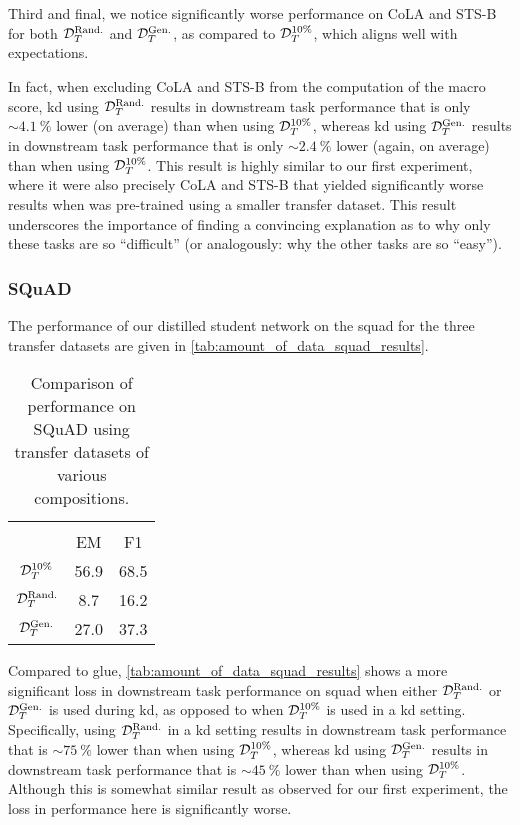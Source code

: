 Third and final, we notice significantly worse performance on CoLA and STS-B for both $\mathcal{D}_T^{\text{Rand.}}$ and $\mathcal{D}_T^{\text{Gen.}}$, as compared to $\mathcal{D}_T^{10\%}$, which aligns well with expectations.

In fact, when excluding CoLA and STS-B from the computation of the macro score, \gls{kd} using $\mathcal{D}_T^{\text{Rand.}}$ results in downstream task performance that is only $\sim \SI{4.1}{\percent}$ lower (on average) than when using $\mathcal{D}_T^{10\%}$, whereas \gls{kd} using $\mathcal{D}_T^{\text{Gen.}}$ results in downstream task performance that is only $\sim \SI{2.4}{\percent}$ lower  (again, on average) than when using $\mathcal{D}_T^{10\%}$. This result is highly similar to our first experiment, where it were also precisely CoLA and STS-B that yielded significantly worse results when \bertstudent was pre-trained using a smaller transfer dataset.  This result underscores the importance of finding a convincing explanation as to why only these tasks are so ``difficult'' (or analogously: why the other tasks are so ``easy'').

\subsubsection{SQuAD}
The performance of our distilled student network \bertstudent on the \gls{squad} for the three transfer datasets  are given in \cref{tab:amount_of_data_squad_results}.
\begin{table}[ht!]
    \footnotesize
    \centering
    \renewcommand{\arraystretch}{1.5}
    \begin{tabular}{c | c c }
        \toprule
        \multirow{2}{*}{\B{Transfer dataset}} & \multicolumn{2}{c}{\B{Score}} \\
        & EM & F1 \\
        \midrule
        $\mathcal{D}_T^{10\%}$ & 56.9 & 68.5 \\
        $\mathcal{D}_T^{\text{Rand.}}$ & 8.7 & 16.2 \\
        $\mathcal{D}_T^{\text{Gen.}}$ &  27.0 & 37.3 \\
        \bottomrule
    \end{tabular}
    \caption[Comparison of performance on SQuAD using differently composed transfer datasets]{Comparison of performance on SQuAD using transfer datasets of various compositions.}
    \label{tab:type_of_data_squad_results}
\end{table}

Compared to \gls{glue}, \cref{tab:amount_of_data_squad_results} shows a more significant loss in downstream task performance on \gls{squad} when either $\mathcal{D}_T^{\text{Rand.}}$ or $\mathcal{D}_T^{\text{Gen.}}$ is used during \gls{kd}, as opposed to when $\mathcal{D}_T^{10\%}$ is used in a \gls{kd} setting. Specifically, using $\mathcal{D}_T^{\text{Rand.}}$ in a \gls{kd} setting results in downstream task performance that is $\sim \SI{75}{\percent}$ lower than when using $\mathcal{D}_T^{10\%}$, whereas \gls{kd} using $\mathcal{D}_T^{\text{Gen.}}$ results in downstream task performance that is $\sim \SI{45}{\percent}$ lower than when using $\mathcal{D}_T^{10\%}$. Although this is somewhat similar result as observed for our first experiment, the loss in performance here is significantly worse.

